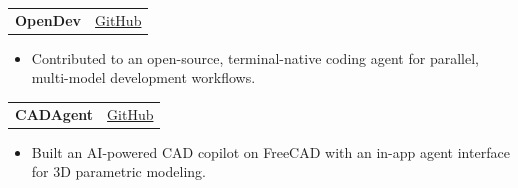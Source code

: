 \newcommand{\project}[3]{
    \noindent
    \begin{tabular*}{\textwidth}{@{\extracolsep{\fill}} l r}
        \textbf{#1} & \href{#2}{GitHub} \\
    \end{tabular*}
    \vspace{-0.75em}
    \begin{itemize}[leftmargin=0.15in, itemsep=1pt, topsep=1pt]
        \item #3
    \end{itemize}
    \vspace{0.25em}
}

\project
    {OpenDev}
    {https://github.com/opendev-to/opendev}
    {Contributed to an open-source, terminal-native coding agent for parallel, multi-model development workflows.}

\project
    {CADAgent}
    {https://github.com/toreleon/CADAgent}
    {Built an AI-powered CAD copilot on FreeCAD with an in-app agent interface for 3D parametric modeling.}
